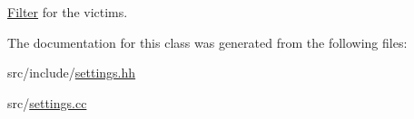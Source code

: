 \mbox{\hyperlink{class_filter}{Filter}} for the victims. 



The documentation for this class was generated from the following files\+:\begin{DoxyCompactItemize}
\item 
src/include/\mbox{\hyperlink{settings_8hh}{settings.\+hh}}\item 
src/\mbox{\hyperlink{settings_8cc}{settings.\+cc}}\end{DoxyCompactItemize}
